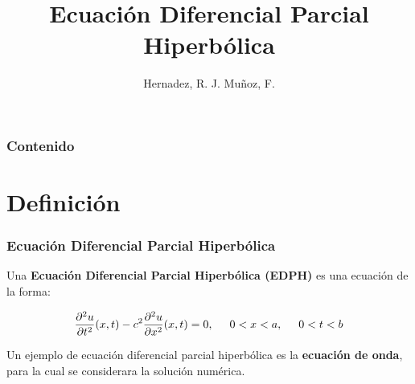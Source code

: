 \documentclass{beamer}
\title[EDP Hiperbólica]{Ecuación Diferencial Parcial Hiperbólica} %
\author{Hernadez, R. J. Muñoz, F.} %
\institute[UdeA] %
{
Universidad de Antioquia \\ %
\medskip
\textit{} %
}
\begin{document}
\begin{frame}
\titlepage %
\end{frame}

\begin{frame}
\frametitle{Contenido} %
\tableofcontents %
\end{frame}


\section{Definición} %


\begin{frame}
\frametitle{Ecuación Diferencial Parcial Hiperbólica}
Una \textbf{ Ecuación Diferencial Parcial Hiperbólica (EDPH)} es una ecuación de la forma:

\begin{equation}\label{eq:onda}
    \frac{\partial^2 u}{\partial t^2}(x,t)-c^2 \frac{\partial^2 u}{\partial x^2}(x,t)=0, \hspace{0.5cm} 0<x<a, \hspace{0.5cm} 0<t<b
\end{equation}

Un ejemplo de ecuación diferencial parcial hiperbólica es la \textbf{ecuación de onda}, para la cual se considerara la solución numérica.

\end{frame}
\end{document}
